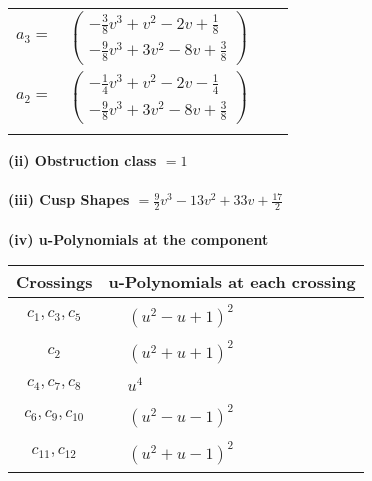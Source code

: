 \documentclass[1p]{elsarticle_modified}
\theoremstyle{definition}
\begin{document}
\begin{tabular}{m{7pt} m{180pt} m{7pt} m{180pt} }
\flushright $a_{3}=$&$\begin{pmatrix}-\frac{3}{8} v^3+v^2-2 v+\frac{1}{8}\\-\frac{9}{8} v^3+3 v^2-8 v+\frac{3}{8}\end{pmatrix}$ \\
\flushright $a_{2}=$&$\begin{pmatrix}-\frac{1}{4} v^3+v^2-2 v-\frac{1}{4}\\-\frac{9}{8} v^3+3 v^2-8 v+\frac{3}{8}\end{pmatrix}$\\&\end{tabular}
\flushleft \textbf{(ii) Obstruction class $= 1$}\\~\\
\flushleft \textbf{(iii) Cusp Shapes $= \frac{9}{2} v^3-13 v^2+33 v+\frac{17}{2}$}\\~\\
\newpage\renewcommand{\arraystretch}{1}
\flushleft \textbf{(iv) u-Polynomials at the component}\newline \\
\begin{tabular}{m{50pt}|m{274pt}}
Crossings & \hspace{64pt}u-Polynomials at each crossing \\
\hline $$\begin{aligned}c_{1},c_{3},c_{5}\end{aligned}$$&$\begin{aligned}
&(u^2- u+1)^2
\end{aligned}$\\
\hline $$\begin{aligned}c_{2}\end{aligned}$$&$\begin{aligned}
&(u^2+u+1)^2
\end{aligned}$\\
\hline $$\begin{aligned}c_{4},c_{7},c_{8}\end{aligned}$$&$\begin{aligned}
&u^4
\end{aligned}$\\
\hline $$\begin{aligned}c_{6},c_{9},c_{10}\end{aligned}$$&$\begin{aligned}
&(u^2- u-1)^2
\end{aligned}$\\
\hline $$\begin{aligned}c_{11},c_{12}\end{aligned}$$&$\begin{aligned}
&(u^2+u-1)^2
\end{aligned}$\\
\hline
\end{tabular}\\~\\
\end{document}
